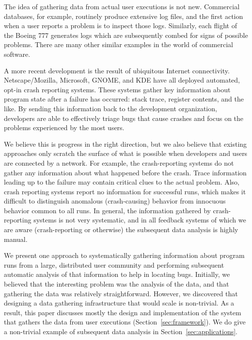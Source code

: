 The idea of gathering data from actual user executions is not new.
Commercial databases, for example, routinely produce extensive log
files, and the first action when a user reports a problem is to
inspect those logs.  Similarly, each flight of the Boeing 777
generates logs which are subsequently combed for signs of possible
problems.  There are many other similar examples in the world of
commercial software.

A more recent development is the result of ubiquitous Internet
connectivity.  Netscape/Mozilla, Microsoft, GNOME, and KDE have all
deployed automated, opt-in crash reporting systems.  These systems
gather key information about program state after a failure has
occurred: stack trace, register contents, and the like.  By sending
this information back to the development organization, developers are
able to effectively triage bugs that cause crashes and focus on the
problems experienced by the most users.

We believe this is progress in the right direction, but we also
believe that existing approaches only scratch the surface of what is
possible when developers and users are connected by a network.  For
example, the crash-reporting systems do not gather any information
about what happened before the crash.  Trace information leading up to
the failure may contain critical clues to the actual problem.  Also,
crash reporting systems report no information for successful runs,
which makes it difficult to distinguish anomalous (crash-causing)
behavior from innocuous behavior common to all runs.  In general, the
information gathered by crash-reporting systems is not very
systematic, and in all feedback systems of which we are aware
(crash-reporting or otherwise) the subsequent data analysis is highly
manual.

We present one approach to systematically gathering information about
program runs from a large, distributed user community and performing
subsequent automatic analysis of that information to help in locating
bugs.  Initially, we believed that the interesting problem was the
analysis of the data, and that gathering the data was relatively
straightforward.  However, we discovered that designing a data
gathering infrastructure that would scale is non-trivial.  As a
result, this paper discusses mostly the design and implementation of
the system that gathers the data from user executions
(Section~\ref{sec:framework}). We do give a non-trivial example of
subsequent data analysis in Section~\ref{sec:applications}.


